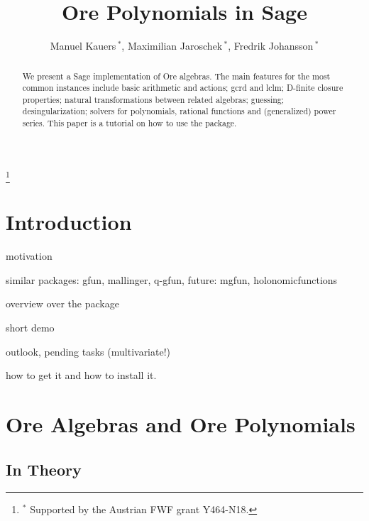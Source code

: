 \documentclass[a4paper,draft]{amsart}
\begin{document}
 \author[Manuel Kauers, Maximilian Jaroschek, Fredrik Johansson]
   {Manuel Kauers\,$^\ast$, Maximilian Jaroschek\,$^\ast$, Fredrik Johansson\,$^\ast$}
 \address{Manuel Kauers, Research Institute for Symbolic Computation (RISC), J. Kepler University Linz, Austria}
 \address{Maximilian Jaroschek, Research Institute for Symbolic Computation (RISC), J. Kepler University Linz, Austria}
 \address{Fredrik Johansson, Research Institute for Symbolic Computation (RISC), J. Kepler University Linz, Austria}
 \thanks{$^\ast$ Supported by the Austrian FWF grant Y464-N18.}

 \title{Ore Polynomials in Sage}

 \begin{abstract}
We present a Sage implementation of Ore algebras. The main features for the most
common instances include basic arithmetic and actions; gcrd and lclm; D-finite
closure properties; natural transformations between related algebras; guessing;
desingularization; solvers for polynomials, rational functions and (generalized)
power series. This paper is a tutorial on how to use the package.
 \end{abstract}

 \maketitle


\section{Introduction}

motivation

similar packages: gfun, mallinger, q-gfun, future: mgfun, holonomicfunctions

overview over the package

short demo

outlook, pending tasks (multivariate!)

how to get it and how to install it. 

\section{Ore Algebras and Ore Polynomials}

\subsection{In Theory}
\end{document}
